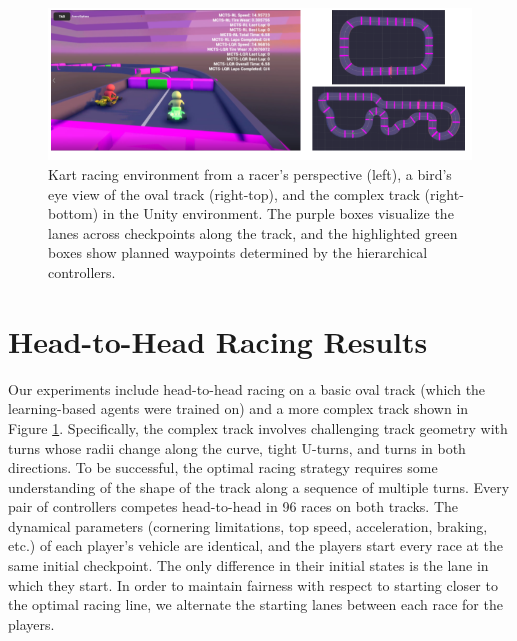 \begin{figure}
  \centering
  \includegraphics[width=\textwidth]{Figures/UnityEnvironment.png}
  \caption[Screenshots of Unity simulation environment] {Kart racing environment from a racer's perspective (left), a bird's eye view of the oval track (right-top), and the complex track (right-bottom) in the Unity environment. The purple boxes visualize the lanes across checkpoints along the track, and the highlighted green boxes show planned waypoints determined by the hierarchical controllers.}
  \label{fig:experiment_tracks}
\end{figure}
\section{Head-to-Head Racing Results}
Our experiments include head-to-head racing on a basic oval track (which the learning-based agents were trained on) and a more complex track shown in Figure \ref{fig:experiment_tracks}. Specifically, the complex track involves challenging track geometry with turns whose radii change along the curve, tight U-turns, and turns in both directions. To be successful, the optimal racing strategy requires some understanding of the shape of the track along a sequence of multiple turns. Every pair of controllers competes head-to-head in 96 races on both tracks. The dynamical parameters (cornering limitations, top speed, acceleration, braking, etc.) of each player's vehicle are identical, and the players start every race at the same initial checkpoint. The only difference in their initial states is the lane in which they start. In order to maintain fairness with respect to starting closer to the optimal racing line, we alternate the starting lanes between each race for the players.

